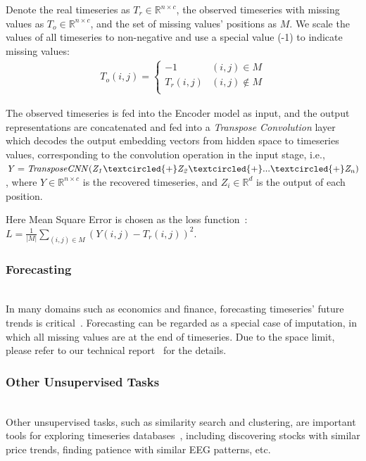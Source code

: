 \begin{sloppypar}
Denote the real timeseries as $T_{r} \in \mathbb{R}^{n \times c}$, the observed timeseries with missing values as $T_{o} \in \mathbb{R}^{n \times c}$, and the set of missing values' positions as $M$. We scale the values of all timeseries to non-negative and use a special value (-1) to indicate missing values:
\vspace{-1mm}
\begin{eqnarray}
\label{eq.imp_task}
T_{o}(i,j) =
\begin{cases}
-1   & (i,j) \in M\\
T_{r}(i,j)   & (i,j) \notin M \\
\end{cases}
\end{eqnarray}

The observed timeseries is fed into the \system Encoder model as input, and the output representations are concatenated and fed into a {\it Transpose Convolution} layer which decodes the output embedding vectors from hidden space to timeseries values, corresponding to the convolution operation in the input stage, i.e., 
$\mathit{Y=TransposeCNN(Z_1 \textcircled{+} Z_2 \textcircled{+} ... \textcircled{+} Z_n)}$, where $Y \in \mathbb{R}^{n \times c}$ is the recovered timeseries, and $Z_i \in \mathbb{R}^d$ is the output of each position.

Here Mean Square Error is chosen as the loss function~\cite{thompson1990mse}:
$L=\frac{1}{|M|}\sum_{(i,j) \in M} (Y(i,j)-T_{r}(i,j))^2$.

\vspace{-2mm}
\subsubsection{Forecasting\nopunct}\ \\
In many domains such as economics and finance, forecasting timeseries' future trends is critical~\cite{atsalakis2011elliott,wang2012stock,pai2005hybrid}. Forecasting can be regarded as a special case of imputation, in which all missing values are at the end of timeseries. 
Due to the space limit, please refer to our technical report~\cite{RITA} for the details.

\vspace{-2mm}
\subsubsection{Other Unsupervised Tasks\nopunct}\ \\
Other unsupervised tasks, such as similarity search and clustering, are important tools for exploring timeseries databases~\cite{lin1995fast,keogh2001dimensionality,liao2005clustering}, including discovering stocks with similar price trends, finding patience with similar EEG patterns, etc.


\end{sloppypar}
